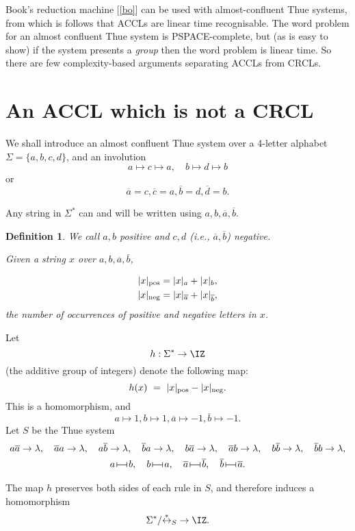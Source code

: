 \documentclass[12pt,a4paper]{article}
\newtheorem{definition}[theorem]{Definition}
\newcommand{\thuecong}{{\overset{*}{\leftrightarrow}}}
\newcommand{\pres}{\,
{\vrule height5pt width.5pt depth0pt
\overset{\vrule height.5pt width10pt depth0pt}
{\vrule height0pt width0pt depth0pt}
\vrule height5pt width.5pt depth0pt}\,}
\numberwithin{equation}{section}
\newcommand{\pos}{{\text{\rm pos}}}
\renewcommand{\neg}{{\text{\rm neg}}}
\newcommand{\be}{\begin{equation*}}
\newcommand{\ee}{\end{equation*}}
\begin{document}
Book's reduction machine [\ref{bo}]
can be used with almost-confluent Thue systems,
from which is follows that ACCLs are linear time recognisable.
The word problem for
an almost confluent Thue system is PSPACE-complete, but
(as is easy to show) if the
system presents a {\em group} then the word problem is linear time.
So there are few complexity-based arguments separating
ACCLs from CRCLs.

\section{An ACCL which is not a CRCL}

We shall introduce an almost confluent Thue system over
a 4-letter alphabet
$\Sigma = \{a,b,c,d\}$, and
an involution
\be
a \mapsto c \mapsto a,\quad
b\mapsto d \mapsto b
\ee
or
\be
\overline{a} = c, \overline{c} = a,
\overline{b} = d, \overline{d} = b.
\ee

\noindent Any string in $\Sigma^*$
can and will be written using $a,b,\overline{a},\overline{b}$.
\begin{definition}
We call $a,b$ {\em positive} and $c,d$ (i.e.,
$\overline{a}, \overline{b}$) {\em negative}.

Given a string $x$ over $a,b,\overline{a},\overline{b}$,

\begin{gather*}
|x|_\pos = |x|_a + |x|_b,\\
|x|_\neg = |x|_{\overline{a}}  + |x|_{\overline{b}},
\end{gather*}
the number of occurrences of positive and negative
letters in $x$.
\end{definition}

Let
\be
h: \Sigma^* \to \IZ
\ee (the additive group of integers) denote the following map:
\be
h(x) ~=~
|x|_\pos - |x|_\neg .
\ee
This is a homomorphism, and
\be
a\mapsto 1, b \mapsto 1,
\overline{a}\mapsto -1, \overline{b}\mapsto -1.
\ee
Let $S$ be the Thue system
\begin{gather*}
a \overline{a} \to \lambda,\quad
\overline{a} a\to \lambda,\quad
a \overline{b} \to \lambda,\quad
\overline{b}a  \to \lambda,\quad
b \overline{a} \to \lambda,\quad
\overline{a} b \to \lambda,\quad
b \overline{b} \to \lambda,\quad
\overline{b} b \to \lambda,\\
a \pres b,\quad b \pres a,
\quad \overline{a} \pres \overline{b},
\quad \overline{b} \pres \overline{a}.
\end{gather*}

\noindent
The map $h$
preserves both sides of each rule in $S$, and
therefore induces a homomorphism
\be
\Sigma^*/ {\thuecong}_S \to \IZ.
\ee
\end{document}
